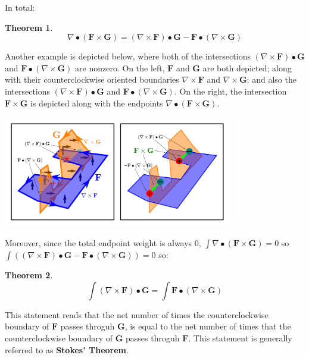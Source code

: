 \documentclass{book}
\newtheorem{thm}{Theorem}
\begin{document}
In total:
\begin{thm}
\[\nabla \bullet (\mathbf{F} \times \mathbf{G}) = (\nabla \times \mathbf{F}) \bullet \mathbf{G} - \mathbf{F} \bullet (\nabla \times \mathbf{G})\]
\end{thm}

Another example is depicted below, where both of the intersections \((\nabla \times \mathbf{F}) \bullet \mathbf{G}\) and \(\mathbf{F} \bullet (\nabla \times \mathbf{G})\) are nonzero. On the left, \(\mathbf{F}\) and \(\mathbf{G}\) are both depicted; along with their counterclockwise oriented boundaries \(\nabla \times \mathbf{F}\) and \(\nabla \times \mathbf{G}\); and also the intersections \((\nabla \times \mathbf{F}) \bullet \mathbf{G}\) and \(\mathbf{F} \bullet (\nabla \times \mathbf{G})\). On the right, the intersection \(\mathbf{F} \times \mathbf{G}\) is depicted along with the endpoints \(\nabla \bullet (\mathbf{F} \times \mathbf{G})\).

\begin{center}
\includegraphics[width = 0.75\textwidth]{Boundaries/Path_endpoints/surface_surface_intersection_endpoints}
\end{center}

Moreover, since the total endpoint weight is always \(0\), \(\int \nabla \bullet (\mathbf{F} \times \mathbf{G}) = 0\) so \(\int ((\nabla \times \mathbf{F}) \bullet \mathbf{G} - \mathbf{F} \bullet (\nabla \times \mathbf{G})) = 0\) so:

\begin{thm}
\[\int (\nabla \times \mathbf{F}) \bullet \mathbf{G} = \int \mathbf{F} \bullet (\nabla \times \mathbf{G})\]
\end{thm}

This statement reads that the net number of times the counterclockwise boundary of \(\mathbf{F}\) passes throguh \(\mathbf{G}\), is equal to the net number of times that the counterclockwise boundary of \(\mathbf{G}\) passes throguh \(\mathbf{F}\). This statement is generally referred to as {\bf Stokes' Theorem}.
\end{document}
